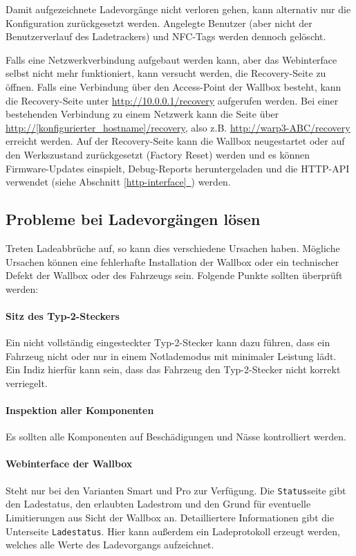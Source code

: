 \documentclass[a4paper,10pt]{article}
\newcommand*{\fullref}[1]{Abschnitt \hyperref[{#1}]{\ref*{#1}~\nameref*{#1}}}
\begin{document}
\begin{multicols*}{2}
    Damit aufgezeichnete Ladevorgänge nicht verloren gehen, kann alternativ nur die Konfiguration zurückgesetzt werden.
    Angelegte Benutzer (aber nicht der Benutzerverlauf des Ladetrackers) und NFC-Tags werden dennoch gelöscht.

    Falls eine Netzwerkverbindung aufgebaut werden kann, aber das Webinterface
	selbst nicht mehr funktioniert, kann versucht werden, die Recovery-Seite zu öffnen.
    Falls eine Verbindung über den Access-Point der Wallbox besteht, kann
	die Recovery-Seite unter \url{http://10.0.0.1/recovery} aufgerufen werden. Bei einer bestehenden Verbindung zu einem Netzwerk kann die Seite über \url{http://[konfigurierter_hostname]/recovery}, also z.B. \url{http://warp3-ABC/recovery} erreicht werden.
    Auf der Recovery-Seite kann die Wallbox neugestartet oder auf den Werkszustand zurückgesetzt (Factory Reset) werden und es können Firmware-Updates einspielt, Debug-Reports
    heruntergeladen und die HTTP-API verwendet (siehe \fullref{http-interface}) werden.

    \subsection{Probleme bei Ladevorgängen lösen}
    Treten Ladeabbrüche auf, so kann dies verschiedene Ursachen haben. Mögliche
    Ursachen können eine fehlerhafte Installation der Wallbox oder ein
    technischer Defekt der Wallbox oder des Fahrzeugs sein.
    Folgende Punkte sollten überprüft werden:

    \paragraph*{Sitz des Typ-2-Steckers} Ein nicht vollständig eingesteckter Typ-2-Stecker kann dazu führen,
        dass ein Fahrzeug nicht oder nur in einem Notlademodus mit minimaler Leistung lädt. Ein Indiz hierfür kann sein, dass
        das Fahrzeug den Typ-2-Stecker nicht korrekt verriegelt.
    \paragraph{Inspektion aller Komponenten} Es sollten alle Komponenten
        auf Beschädigungen und Nässe kontrolliert werden.
    \paragraph{Webinterface der Wallbox} Steht nur bei den Varianten Smart und
        Pro zur Verfügung. Die \texttt{Status}seite gibt den Ladestatus, den erlaubten Ladestrom und den Grund für eventuelle Limitierungen aus
        Sicht der Wallbox an. Detailliertere Informationen gibt die
        Unterseite \texttt{Ladestatus}. Hier kann außerdem ein Ladeprotokoll
        erzeugt werden, welches alle Werte des Ladevorgangs aufzeichnet.

\end{multicols*}
\end{document}
